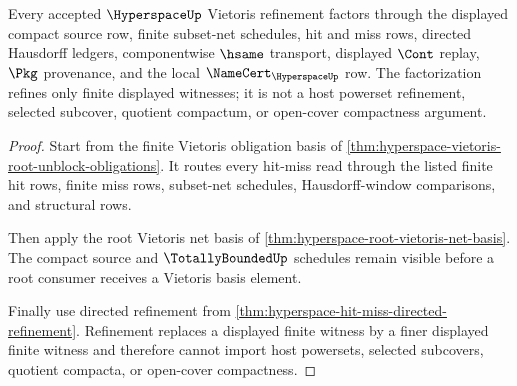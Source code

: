 \begin{theorem}
\label{thm:hyperspace-vietoris-refinement-factorization}
Every accepted $\HyperspaceUp$ Vietoris refinement factors through the displayed compact source row, finite subset-net schedules, hit and miss rows, directed Hausdorff ledgers, componentwise $\hsame$ transport, displayed $\Cont$ replay, $\Pkg$ provenance, and the local $\NameCert_{\HyperspaceUp}$ row. The factorization refines only finite displayed witnesses; it is not a host powerset refinement, selected subcover, quotient compactum, or open-cover compactness argument.
\end{theorem}
\begin{proof}
Start from the finite Vietoris obligation basis of \autoref{thm:hyperspace-vietoris-root-unblock-obligations}. It routes every hit-miss read through the listed finite hit rows, finite miss rows, subset-net schedules, Hausdorff-window comparisons, and structural rows.

Then apply the root Vietoris net basis of \autoref{thm:hyperspace-root-vietoris-net-basis}. The compact source and $\TotallyBoundedUp$ schedules remain visible before a root consumer receives a Vietoris basis element.

Finally use directed refinement from \autoref{thm:hyperspace-hit-miss-directed-refinement}. Refinement replaces a displayed finite witness by a finer displayed finite witness and therefore cannot import host powersets, selected subcovers, quotient compacta, or open-cover compactness.
\end{proof}

